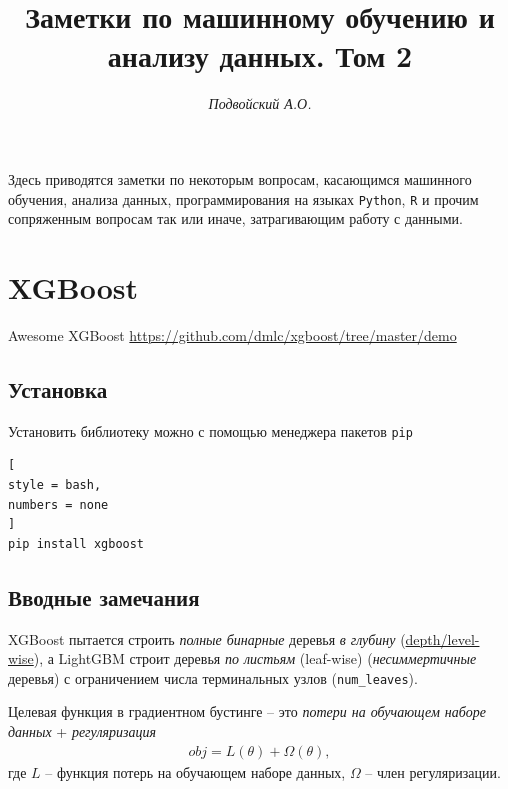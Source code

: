 \documentclass[%
	11pt,
	a4paper,
	utf8,
		]{article}
\begin{document}
\title{Заметки по машинному обучению и анализу данных. Том 2}

\author{\itshape Подвойский А.О.}

\date{}
\maketitle

\thispagestyle{fancy}

Здесь приводятся заметки по некоторым вопросам, касающимся машинного обучения, анализа данных, программирования на языках \texttt{Python}, \texttt{R} и прочим сопряженным вопросам так или иначе, затрагивающим работу с данными.



\tableofcontents

\section{XGBoost}

Awesome XGBoost \url{https://github.com/dmlc/xgboost/tree/master/demo}

\subsection{Установка}

Установить библиотеку можно с помощью менеджера пакетов \verb|pip|
\begin{lstlisting}[
style = bash,
numbers = none	
]
pip install xgboost
\end{lstlisting}

\subsection{Вводные замечания}

XGBoost пытается строить \emph{полные бинарные} деревья \emph{в глубину} (\href{https://lightgbm.readthedocs.io/en/latest/Experiments.html}{depth/level-wise}), а LightGBM строит деревья \emph{по листьям} (leaf-wise) (\emph{несиммертичные} деревья) с ограничением числа терминальных узлов (\verb|num_leaves|).

Целевая функция в градиентном бустинге -- это \emph{потери на обучающем наборе данных} + \emph{регуляризация}
\begin{align*}
	obj  = L(\theta) + \Omega (\theta),
\end{align*}
где $ L $ -- функция потерь на обучающем наборе данных, $ \Omega $ -- член регуляризации.
\end{document}

